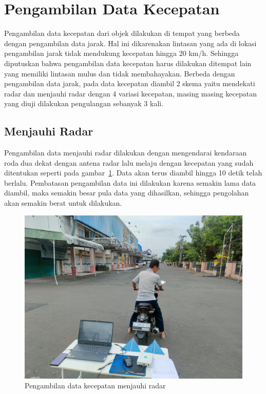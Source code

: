 \section{Pengambilan Data Kecepatan}

Pengambilan data kecepatan dari objek dilakukan di tempat yang berbeda dengan pengambilan data jarak. Hal ini dikarenakan lintasan yang ada di lokasi pengambilan jarak tidak mendukung kecepatan hingga 20 km/h. Sehingga diputuskan bahwa pengambilan data kecepatan harus dilakukan ditempat lain yang memiliki lintasan mulus dan tidak membahayakan. Berbeda dengan pengambilan data jarak, pada data kecepatan diambil 2 skema yaitu mendekati radar dan menjauhi radar dengan 4 variasi kecepatan, masing masing kecepatan yang diuji dilakukan pengulangan sebanyak 3 kali. 

\subsection{Menjauhi Radar}

Pengambilan data menjauhi radar dilakukan dengan mengendarai kendaraan roda dua dekat dengan antena radar lalu melaju dengan kecepatan yang sudah ditentukan seperti pada gambar~\ref{fig:pengambilanMenjauhi}. Data akan terus diambil hingga 10 detik telah berlalu. Pembatasan pengambilan data ini dilakukan karena semakin lama data diambil, maka semakin besar pula data yang dihasilkan, sehingga pengolahan akan semakin berat untuk dilakukan.

\begin{figure}
	\centering
	\includegraphics[scale=0.07]{pics/bab4/PengujianVelocity/1.jpg}
	\caption{Pengambilan data kecepatan menjauhi radar}
	\label{fig:pengambilanMenjauhi}
\end{figure}

